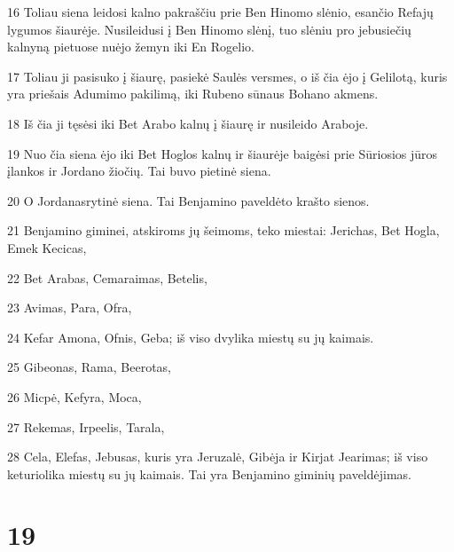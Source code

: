 \par 16 Toliau siena leidosi kalno pakraščiu prie Ben Hinomo slėnio, esančio Refajų lygumos šiaurėje. Nusileidusi į Ben Hinomo slėnį, tuo slėniu pro jebusiečių kalnyną pietuose nuėjo žemyn iki En Rogelio. 
\par 17 Toliau ji pasisuko į šiaurę, pasiekė Saulės versmes, o iš čia ėjo į Gelilotą, kuris yra priešais Adumimo pakilimą, iki Rubeno sūnaus Bohano akmens. 
\par 18 Iš čia ji tęsėsi iki Bet Arabo kalnų į šiaurę ir nusileido Araboje. 
\par 19 Nuo čia siena ėjo iki Bet Hoglos kalnų ir šiaurėje baigėsi prie Sūriosios jūros įlankos ir Jordano žiočių. Tai buvo pietinė siena. 
\par 20 O Jordanas­rytinė siena. Tai Benjamino paveldėto krašto sienos. 
\par 21 Benjamino giminei, atskiroms jų šeimoms, teko miestai: Jerichas, Bet Hogla, Emek Kecicas, 
\par 22 Bet Arabas, Cemaraimas, Betelis, 
\par 23 Avimas, Para, Ofra, 
\par 24 Kefar Amona, Ofnis, Geba; iš viso dvylika miestų su jų kaimais. 
\par 25 Gibeonas, Rama, Beerotas, 
\par 26 Micpė, Kefyra, Moca, 
\par 27 Rekemas, Irpeelis, Tarala, 
\par 28 Cela, Elefas, Jebusas, kuris yra Jeruzalė, Gibėja ir Kirjat Jearimas; iš viso keturiolika miestų su jų kaimais. Tai yra Benjamino giminių paveldėjimas.



\chapter{19}

